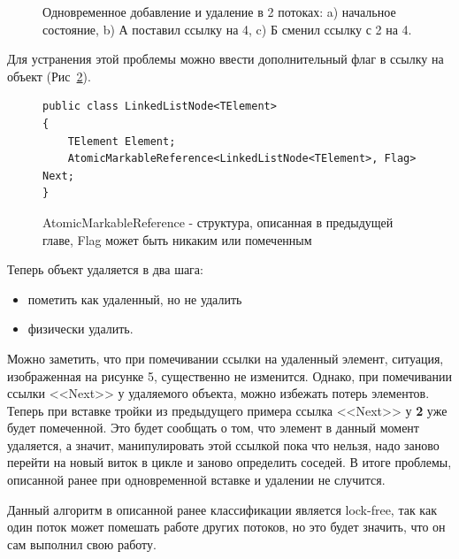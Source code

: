 \documentclass[12pt]{report}
\begin{document}
{\begin{figure}[h!]
\begin{minipage}[h]{0.45\linewidth}
{					\label{pic:insertDeleteC}
				}
			\end{minipage}
			\caption{Одновременное добавление и удаление в 2 потоках: a) начальное состояние, b) А поставил ссылку на 4, c) Б сменил ссылку с 2 на 4.}
		\end{figure}
		\par Для устранения этой проблемы можно ввести дополнительный флаг в ссылку на объект (Рис~\ref{pic:listAMR}).
		\begin{figure}[h]
			\begin{lstlisting}
public class LinkedListNode<TElement>
{
	TElement Element;
	AtomicMarkableReference<LinkedListNode<TElement>, Flag> Next;
}
			\end{lstlisting}
			\caption{AtomicMarkableReference - структура, описанная в предыдущей главе, Flag может быть никаким или помеченным}
			\label{pic:listAMR}
		\end{figure}
		\par Теперь объект удаляется в два шага: 
		\begin{itemize}
			\item пометить как удаленный, но не удалить
			\item физически удалить. 
		\end{itemize}
		Можно заметить, что при помечивании ссылки на удаленный элемент, ситуация, изображенная на рисунке 5, существенно не изменится. Однако, при помечивании ссылки <<Next>> у удаляемого объекта, можно избежать потерь элементов. Теперь при вставке тройки из предыдущего примера ссылка <<Next>> у \textbf{2} уже будет помеченной. Это будет сообщать о том, что элемент в данный момент удаляется, а значит, манипулировать этой ссылкой пока что нельзя, надо заново перейти на новый виток в цикле и заново определить соседей. В итоге проблемы, описанной ранее при одновременной вставке и удалении не случится.
		\par Данный алгоритм в описанной ранее классификации является lock-free, так как один поток может помешать работе других потоков, но это будет значить, что он сам выполнил свою работу.
}
\end{document}

